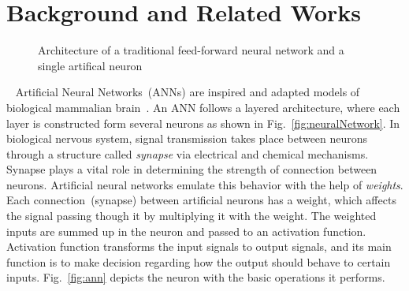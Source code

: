 \section{Background and Related Works}

\begin{figure}[t!]
    \centering
    \caption{Architecture of a traditional feed-forward neural network and a single artifical neuron}
\end{figure}


~\cite{Furber2013}
Artificial Neural Networks~(ANNs) are inspired and adapted models of biological mammalian brain~\cite{}.
An ANN follows a layered architecture, where each layer is constructed form several neurons as shown in Fig.~\ref{fig:neuralNetwork}. 
In biological nervous system, signal transmission takes place between neurons through a structure called \emph{synapse} via electrical and chemical mechanisms. 
Synapse plays a vital role in determining the strength of connection between neurons.
Artificial neural networks emulate this behavior with the help of \emph{weights}.
Each connection~(synapse) between artificial neurons has a weight, which affects the signal passing though it by multiplying it with the weight. 
The weighted inputs are summed up in the neuron and passed to an activation function. 
Activation function transforms the input signals to output signals, and its main function is to make decision regarding how the output should behave to certain inputs. Fig.~\ref{fig:ann} depicts the neuron with the basic operations it performs. 

